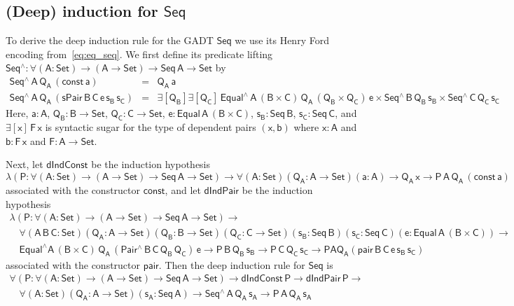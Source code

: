 \documentclass[9pt]{entcs}
\begin{document}
\subsection{(Deep) induction for $\mathsf{Seq}$}\label{sec:ind-seq}

To derive the deep induction rule for the GADT $\mathsf{Seq}$ we use
its Henry Ford encoding from~\eqref{eq:eq_seq}.  We first define its
predicate lifting $\mathsf{Seq^\wedge : \forall (A : Set) \to (A \to
  Set) \to Seq\,A \to Set}$ by
\[\begin{array}{lll}
\mathsf{Seq^{\wedge}\,A\,Q_A\,(const\,a)} & = & \mathsf{Q_A\,a}\\
\mathsf{Seq^{\wedge}\,A\,Q_A\,(sPair\,B\,C\,e\,s_B\,s_C)}
&=&\mathsf{\exists [Q_B] \exists [Q_C]\, Equal^{\wedge}\,A\, (B
  \times C)\, Q_A\, (Q_B \times Q_C) \, e \times
  Seq^{\wedge}\,B\,Q_B\,s_B \times Seq^{\wedge}\,C\,Q_C\,s_C}
\end{array}\]
Here, $\mathsf{a : A}$, $\mathsf{Q_B : B \to Set}$, $\mathsf{Q_C : C
  \to Set}$, $\mathsf{e : Equal\,A\,(B \times C)}$, $\mathsf{s_B :
  Seq\,B}$, $\mathsf{s_C : Seq\,C}$, and $\mathsf{\exists [x]\, F
  \,x}$ is syntactic sugar for the type of dependent pairs
$\mathsf{(x,b)}$ where $\mathsf{x : A}$ and $\mathsf{b : F\, x}$ and
$\mathsf{F : A \to Set}$.

Next, let $\mathsf{dIndConst}$ be the induction hypothesis
\[\mathsf{
\lambda (P : \forall (A : Set) \to (A \to Set) \to Seq\,A \to Set) \to
\forall (A : Set) (Q_A : A \to Set) (a : A) \to Q_A\,x \to
P\,A\,Q_A\,(const\,a)}\] associated with the constructor
$\mathsf{const}$, and let $\mathsf{dIndPair}$ be the induction
hypothesis
\[\begin{array}{l}
\mathsf{\lambda (P : \forall (A : Set) \to (A \to Set) \to Seq\,A \to
  Set)} \to \\ 
\quad \mathsf{\forall (A\,B\,C : Set) (Q_A : A \to Set) (Q_B : B
  \to Set) (Q_C : C \to Set)(s_B : Seq\,B) (s_C : Seq\,C) (e :
  Equal\,A\,(B \times C)) \to} \\ 
\quad \mathsf{Equal^{\wedge} A\, (B \times C)\, Q_A\,
  (Pair^{\wedge}\,B\,C\,Q_B\,Q_C)\, e \to P\,B\,Q_B\,s_B \to
  P\,C\,Q_C\,s_C \to P A Q_A ( pair\,B\,C\,e\,s_B\,s_C )}
\end{array}\]
associated with the constructor $\mathsf{pair}$. Then the deep
induction rule for $\mathsf{Seq}$ is
\begin{equation}\label{eq:ind-seq}
\begin{array}{l}
\mathsf{\forall (P : \forall (A : Set) \to (A \to Set) \to Seq\,A \to
  Set)} \mathsf{\to dIndConst\,P \to dIndPair\,P \to} \\ \quad
\mathsf{\forall (A : Set)(Q_A : A \to Set)(s_A : Seq\,A) \to
  Seq^{\wedge}\,A\,Q_A\,s_A \to P\,A\,Q_A\,s_A}
\end{array}
\end{equation}
\end{document}
